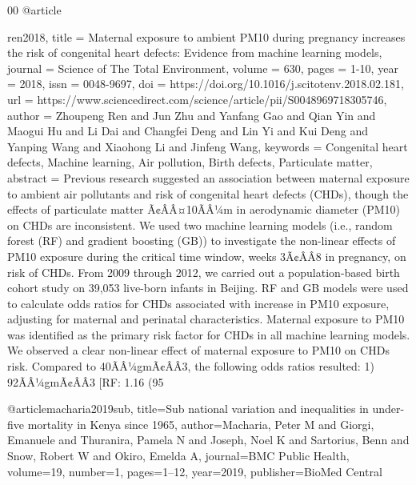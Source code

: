 \documentclass[preprint,12pt]{elsarticle}
\begin{document}
\begin{thebibliography}{00}
@article{ren2018,
title = {{Maternal exposure to ambient PM10 during pregnancy increases the risk of congenital heart defects: Evidence from machine learning models}},
journal = {Science of The Total Environment},
volume = {630},
pages = {1-10},
year = {2018},
issn = {0048-9697},
doi = {https://doi.org/10.1016/j.scitotenv.2018.02.181},
url = {https://www.sciencedirect.com/science/article/pii/S0048969718305746},
author = {Zhoupeng Ren and Jun Zhu and Yanfang Gao and Qian Yin and Maogui Hu and Li Dai and Changfei Deng and Lin Yi and Kui Deng and Yanping Wang and Xiaohong Li and Jinfeng Wang},
keywords = {Congenital heart defects, Machine learning, Air pollution, Birth defects, Particulate matter},
abstract = {Previous research suggested an association between maternal exposure to ambient air pollutants and risk of congenital heart defects (CHDs), though the effects of particulate matter Ã¢ÂÂ¤10ÃÂ¼m in aerodynamic diameter (PM10) on CHDs are inconsistent. We used two machine learning models (i.e., random forest (RF) and gradient boosting (GB)) to investigate the non-linear effects of PM10 exposure during the critical time window, weeks 3Ã¢ÂÂ8 in pregnancy, on risk of CHDs. From 2009 through 2012, we carried out a population-based birth cohort study on 39,053 live-born infants in Beijing. RF and GB models were used to calculate odds ratios for CHDs associated with increase in PM10 exposure, adjusting for maternal and perinatal characteristics. Maternal exposure to PM10 was identified as the primary risk factor for CHDs in all machine learning models. We observed a clear non-linear effect of maternal exposure to PM10 on CHDs risk. Compared to 40ÃÂ¼gmÃ¢ÂÂ3, the following odds ratios resulted: 1) 92ÃÂ¼gmÃ¢ÂÂ3 [RF: 1.16 (95%
}

@article{macharia2019sub,
  title={{Sub national variation and inequalities in under-five mortality in Kenya since 1965}},
  author={Macharia, Peter M and Giorgi, Emanuele and Thuranira, Pamela N and Joseph, Noel K and Sartorius, Benn and Snow, Robert W and Okiro, Emelda A},
  journal={BMC Public Health},
  volume={19},
  number={1},
  pages={1--12},
  year={2019},
  publisher={BioMed Central}
}

}
\end{thebibliography}
\end{document}
